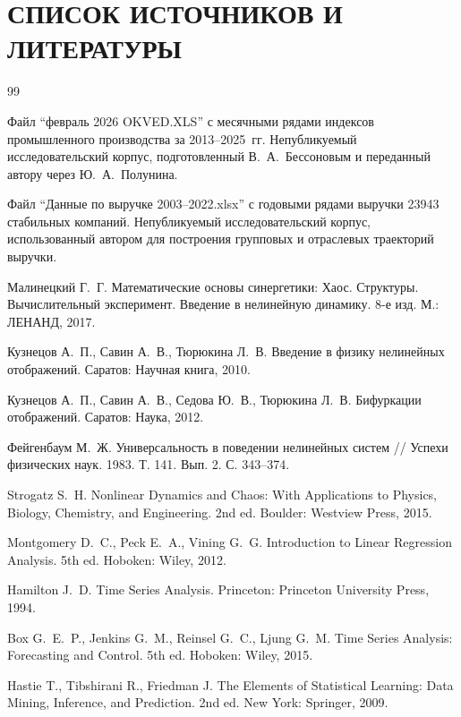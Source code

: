 \chapter*{СПИСОК ИСТОЧНИКОВ И ЛИТЕРАТУРЫ}

\begin{thebibliography}{99}

Файл ``февраль 2026 OKVED.XLS'' с месячными рядами индексов промышленного производства за 2013--2025~гг. Непубликуемый исследовательский корпус, подготовленный В.~А.~Бессоновым и переданный автору через Ю.~А.~Полунина.

Файл ``Данные по выручке 2003--2022.xlsx'' с годовыми рядами выручки 23943 стабильных компаний. Непубликуемый исследовательский корпус, использованный автором для построения групповых и отраслевых траекторий выручки.

Малинецкий Г.~Г. Математические основы синергетики: Хаос. Структуры. Вычислительный эксперимент. Введение в нелинейную динамику. 8-е изд. М.: ЛЕНАНД, 2017.

Кузнецов А.~П., Савин А.~В., Тюрюкина Л.~В. Введение в физику нелинейных отображений. Саратов: Научная книга, 2010.

Кузнецов А.~П., Савин А.~В., Седова Ю.~В., Тюрюкина Л.~В. Бифуркации отображений. Саратов: Наука, 2012.

Фейгенбаум М.~Ж. Универсальность в поведении нелинейных систем // Успехи физических наук. 1983. Т. 141. Вып. 2. С. 343--374.

Strogatz S.~H. Nonlinear Dynamics and Chaos: With Applications to Physics, Biology, Chemistry, and Engineering. 2nd ed. Boulder: Westview Press, 2015.

Montgomery D.~C., Peck E.~A., Vining G.~G. Introduction to Linear Regression Analysis. 5th ed. Hoboken: Wiley, 2012.

Hamilton J.~D. Time Series Analysis. Princeton: Princeton University Press, 1994.

Box G.~E.~P., Jenkins G.~M., Reinsel G.~C., Ljung G.~M. Time Series Analysis: Forecasting and Control. 5th ed. Hoboken: Wiley, 2015.

Hastie T., Tibshirani R., Friedman J. The Elements of Statistical Learning: Data Mining, Inference, and Prediction. 2nd ed. New York: Springer, 2009.


\end{thebibliography}
